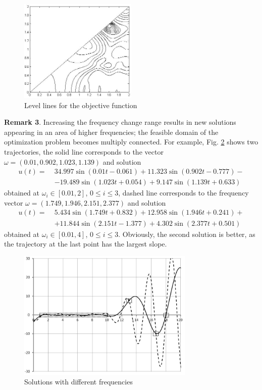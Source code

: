 \documentclass{llncs}
\begin{document}
\begin{figure}
	\centering
		\includegraphics[width=0.50\textwidth]{fig6.JPG} 
	\caption{Level lines for the objective function} \label{fig:fig6}	
\end{figure}

\textbf{Remark 3}. Increasing the frequency change range results in new solutions appearing in an area of higher frequencies; the feasible domain of the optimization problem becomes multiply connected. For example, Fig. \ref{fig:fig7} shows two trajectories, the solid line corresponds to the vector $\omega =(0.01, 0.902, 1.023, 1.139)$ and solution
\begin{eqnarray*} 
u(t)= \; &34.997\sin(0.01t-0.061)+11.323\sin(0.902t-0.777)-  \\
      &-19.489\sin(1.023t+0.054)+9.147 \sin(1.139t+0.633) 
\end{eqnarray*}
obtained at  $\omega_i\in[0.01, 2]$, $0\leq i\leq3$, dashed line corresponds to the frequency vector  $\omega=(1.749, 1.946, 2.151, 2.377)$ and solution 
\begin{eqnarray*} 
u(t)= \; &5.434 \sin( 1.749 t + 0.832 ) + 12.958 \sin( 1.946 t + 0.241)+  \\
      &+11.844 \sin( 2.151 t - 1.377 ) + 4.302 \sin( 2.377 t + 0.501)
\end{eqnarray*}
obtained at $\omega_i\in[0.01, 4]$, $0\leq i\leq 3$. Obviously, the second solution is better, as the trajectory at the last point has the largest slope.

\begin{figure}
\begin{center}
  \includegraphics[width=0.75\textwidth]{fig7.jpg} 
  \caption{Solutions with different frequencies}\label{fig:fig7} 
\end{center}
\end{figure}
\end{document}
